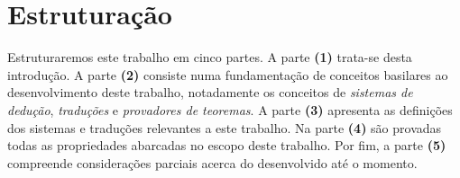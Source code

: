     \section{Estruturação}
    Estruturaremos este trabalho em cinco partes. A parte \textbf{(1)} trata-se desta introdução. A parte \textbf{(2)} consiste numa fundamentação de conceitos basilares ao desenvolvimento deste trabalho, notadamente os conceitos de \emph{sistemas de dedução}, \emph{traduções} e \emph{provadores de teoremas}. A parte \textbf{(3)} apresenta as definições dos sistemas e traduções relevantes a este trabalho. Na parte \textbf{(4)} são provadas todas as propriedades abarcadas no escopo deste trabalho. Por fim, a parte \textbf{(5)} compreende considerações parciais acerca do desenvolvido até o momento.